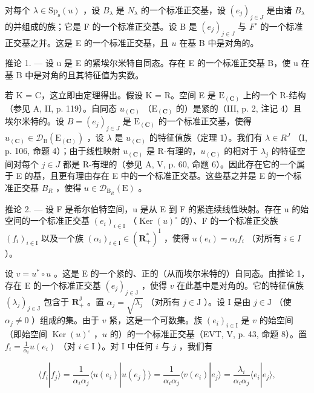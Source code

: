 对每个 \(\lambda \in \mathrm{Sp}_{\mathrm{s}}(u)\) ，设 \(B_{\lambda}\) 是 \(N_{\lambda}\) 的一个标准正交基，设 \((e_j)_{j \in J}\) 是由诸 \(B_{\lambda}\) 的并组成的族；它是 F 的一个标准正交基。设 B 是 \((e_j)_{j \in J}\) 与 \(F^{\circ}\) 的一个标准正交基之并。这是 E 的一个标准正交基，且 \(u\) 在基 B 中是对角的。

推论 1. --- 设 u 是 E 的紧埃尔米特自同态。存在 E 的一个标准正交基 B，使 u 在基 B 中是对角的且其特征值为实数。

若 K = C，这立即由定理得出。假设 K = R。空间 E 是 \(\mathrm{E}_{(\mathbf{C})}\) 上的一个 R-结构（参见 A, II, p. 119）。自同态 \(u_{(\mathbf{C})}\) （\(\mathrm{E}_{(\mathbf{C})}\) 的）是紧的（III, p. 2, 注记 4）且埃尔米特的。设 \(B = (e_j)_{j \in J}\) 是 \(\mathrm{E}_{(\mathbf{C})}\) 的一个标准正交基，使得 \(u_{(\mathbf{C})} \in \mathcal{D}_{\mathrm{B}}(\mathrm{E}_{(\mathbf{C})})\) ，设 \(\lambda\) 是 \(u_{(\mathbf{C})}\) 的特征值族（定理 1）。我们有 \(\lambda \in R^{J}\) （I, p. 106, 命题 4）；由于线性映射 \(u_{(\mathbf{C})}\) 是 R-有理的，\(u_{(\mathbf{C})}\) 的相对于 \(\lambda_j\) 的特征空间对每个 \(j \in J\) 都是 R-有理的（参见 A, V, p. 60, 命题 6）。因此存在它的一个属于 E 的基，且更有理由存在 E 中的一个标准正交基。这些基之并是 E 的一个标准正交基 \(B_R\) ，使得 \(u \in \mathcal{D}_{\mathrm{B}_R}(\mathrm{E})\) 。

推论 2. --- 设 F 是希尔伯特空间，u 是从 E 到 F 的紧连续线性映射。存在 u 的始空间的一个标准正交基 \((e_{i})_{i\in\mathrm{I}}\) （\(\operatorname{Ker}(u)^{\circ}\) 的）、F 的一个标准正交族 \((f_{i})_{i\in\mathrm{I}}\) 以及一个族 \((\alpha_{i})_{i\in\mathrm{I}}\in(\mathbf{R}_{+}^{*})^{\mathrm{I}}\) ，使得 \(u(e_{i})=\alpha_{i}f_{i}\) （对所有 \(i\in I\) ）。

设 \(v = u^{*} \circ u\) 。这是 E 的一个紧的、正的（从而埃尔米特的）自同态。由推论 1，存在 E 的一个标准正交基 \((e_{j})_{j \in \mathrm{J}}\) ，使得 \(v\) 在此基中是对角的。它的特征值族 \((\lambda_{j})_{j \in \mathrm{J}}\) 包含于 \(\mathbf{R}_{+}^{\mathrm{J}}\) 。置 \(\alpha_{j} = \sqrt{\lambda_{j}}\) （对所有 \(j \in \mathrm{J}\) ）。设 I 是由 \(j \in \mathrm{J}\) （使 \(\alpha_{j} \neq 0\) ）组成的集。由于 \(v\) 紧，这是一个可数集。族 \((e_{i})_{i \in \mathrm{I}}\) 是 \(v\) 的始空间（即始空间 \(\operatorname{Ker}(u)^{\circ}\) ，\(u\) 的）的一个标准正交基（EVT, V, p. 43, 命题 8）。置 \(f_{i} = \frac{1}{\alpha_{i}} u(e_{i})\) （对 \(i\in \mathrm{I}\) ）。对 I 中任何 \(i\) 与 \(j\) ，我们有

\[
\langle f _ {i} | f _ {j} \rangle = \frac {1}{\alpha_ {i} \alpha_ {j}} \langle u (e _ {i}) | u (e _ {j}) \rangle = \frac {1}{\alpha_ {i} \alpha_ {j}} \langle v (e _ {i}) | e _ {j} \rangle = \frac {\lambda_ {i}}{\alpha_ {i} \alpha_ {j}} \langle e _ {i} | e _ {j} \rangle ,
\]

